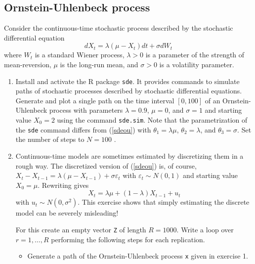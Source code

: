 \documentclass{article}
\begin{document}
\subsection{Ornstein-Uhlenbeck process\label{ouprocess}}

Consider the continuous-time stochastic process described by the stochastic
differential equation%
\begin{equation}
dX_{t}=\lambda \left( \mu -X_{t}\right) dt+\sigma dW_{t}  \label{sdeou}
\end{equation}%
where $W_{t}$ is a standard Wiener process, $\lambda >0$ is a parameter of
the strength of mean-reversion, $\mu $ is the long-run mean, and $\sigma >0$
is a volatility parameter.

\begin{enumerate}\setlength{\itemsep}{-1pt}
\item Install and activate the R package \texttt{sde}. It provides commands
to simulate paths of stochastic processes described by stochastic
differential equations. Generate and plot a single path on the time interval
$[0,100]$ of an Ornstein-Uhlenbeck process with parameters $\lambda =0.9$, $%
\mu =0$, and $\sigma =1$ and starting value $X_{0}=2$ using the command
\texttt{sde.sim}. Note that the parametrization of the \texttt{sde} command
differs from (\ref{sdeou}) with $\theta _{1}=\lambda \mu $, $\theta
_{2}=\lambda $, and $\theta _{3}=\sigma $. Set the number of steps to $N=100$%
.

\item Continuous-time models are sometimes estimated by discretizing them in
a rough way. The discretized version of (\ref{sdeou}) is, of course, $X_{t}-X_{t-1}=\lambda \left( \mu -X_{t-1}\right) +\sigma \varepsilon _{t}$ with $\varepsilon _{t}\sim N(0,1)$ and starting value $X_{0}=\mu $. Rewriting gives%
\begin{equation*}
X_{t}=\lambda \mu +\left( 1-\lambda \right) X_{t-1}+u_{t}
\end{equation*}%
with $u_{t}\sim N(0,\sigma ^{2})$. This exercise shows that simply
estimating the discrete model can be severely misleading!

For this create an empty vector \texttt{Z} of length $R=1000$. Write a loop over $%
r=1,\ldots ,R$ performing the following steps for each replication.

\begin{itemize}
\item Generate a path of the Ornstein-Uhlenbeck process \texttt{x} given in
exercise 1.


\end{itemize}
\end{enumerate}
\end{document}
